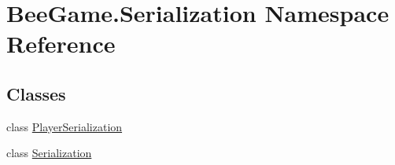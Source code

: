 \hypertarget{namespace_bee_game_1_1_serialization}{}\section{Bee\+Game.\+Serialization Namespace Reference}
\label{namespace_bee_game_1_1_serialization}
\subsection*{Classes}
\begin{DoxyCompactItemize}
\item 
class \hyperlink{class_bee_game_1_1_serialization_1_1_player_serialization}{Player\+Serialization}
\item 
class \hyperlink{class_bee_game_1_1_serialization_1_1_serialization}{Serialization}
\end{DoxyCompactItemize}
